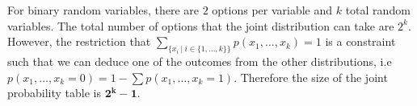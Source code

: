 For binary random variables, there are $2$ options per variable and $k$ total random variables. The total number of options that the joint distribution can take are $2^k$. However, the restriction that $\sum_{\{x_i ~|~ i \in \{1,\dots,k\}\}}p(x_1,\dots,x_k) = 1$ is a constraint such that we can deduce one of the outcomes from the other distributions, i.e $p(x_1, \dots, x_k = 0) = 1-\sum p(x_1, \dots, x_k=1)$. Therefore the size of the joint probability table is $\mathbf{2^k - 1}$.